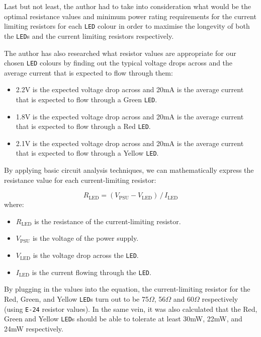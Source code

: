 \documentclass[12pt]{article}
\begin{document}
Last but not least, the author had to take into consideration what would be the optimal resistance values and minimum power rating requirements for the current limiting resistors for each \texttt{LED} colour in order to maximise the longevity of both the \texttt{LED}s and the current limiting resistors respectively.   

The author has also researched what resistor values are appropriate for our chosen \texttt{LED} colours by finding out the typical voltage drops across and the average current that is expected to flow through them\cite{LED}:

\begin{itemize}

\item 2.2V is the expected voltage drop across and 20mA is the average current that is expected to flow through a Green \texttt{LED}.

\item 1.8V is the expected voltage drop across and 20mA is the average current that is expected to flow through a Red \texttt{LED}.

\item 2.1V is the expected voltage drop across and 20mA is the average current that is expected to flow through a Yellow \texttt{LED}.
\end{itemize}

By applying basic circuit analysis techniques, we can mathematically express the resistance value for each current-limiting resistor:

\begin{equation*}
    R_\text{LED} = \left(V_\text{PSU} - V_\text{LED}\right) \,/\, I_\text{LED}
\end{equation*} where:

\begin{itemize}
    \item $R_\mathrm{LED}$ is the resistance of the current-limiting resistor.
    \item $V_\mathrm{PSU}$ is the voltage of the power supply.
    \item $V_\mathrm{LED}$ is the voltage drop across the \texttt{LED}.
    \item $I_\mathrm{LED}$ is the current flowing through the \texttt{LED}.
\end{itemize}

By plugging in the values into the equation, the current-limiting resistor for the Red, Green, and Yellow \texttt{LED}s turn out to be 75$\Omega$, 56$\Omega$ and 60$\Omega$ respectively (using \texttt{E-24} resistor values). In the same vein, it was also calculated that the Red, Green and Yellow \texttt{LED}s should be able to tolerate at least 30mW, 22mW, and 24mW respectively. 
\end{document}
